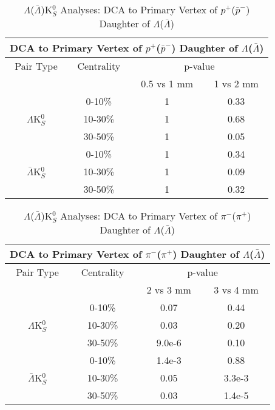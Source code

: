 \documentclass[../AnalysisNoteJBuxton.tex]{subfiles}
\begin{document}
\begin{table}
 \centering
 \begin{tabular}{|c|c|c|c|}
 \multicolumn{4}{c}{DCA to Primary Vertex of $p^{+}$($\bar{p}^{-}$) Daughter of $\Lambda$($\bar{\Lambda}$)} \\
  \hline
  Pair Type & Centrality & \multicolumn{2}{c|}{p-value} \\
  \cline{3-4}
   & & 0.5 vs 1 mm & 1 vs 2 mm \\
  \hline
   & 0-10\% & 1 & 0.33 \\
  $\Lambda$K$^{0}_{S}$ 
   & 10-30\% & 1 & 0.68 \\
   & 30-50\% & 1 & 0.05 \\
  \hline
   & 0-10\% & 1 & 0.34 \\
  $\bar{\Lambda}$K$^{0}_{S}$ 
   & 10-30\% & 1 & 0.09 \\
   & 30-50\% & 1 & 0.32 \\
  \hline
 \end{tabular}
 \caption{$\Lambda$($\bar{\Lambda}$)K$^{0}_{S}$ Analyses: DCA to Primary Vertex of $p^{+}$($\bar{p}^{-}$) Daughter of $\Lambda$($\bar{\Lambda}$)}
 \label{tab:DcaToPrimVertexProtonDaughtOfLamLamK0}
\end{table}

\begin{table}
 \centering
 \begin{tabular}{|c|c|c|c|}
 \multicolumn{4}{c}{DCA to Primary Vertex of $\pi^{-}$($\pi^{+}$) Daughter of $\Lambda$($\bar{\Lambda}$)} \\
  \hline
  Pair Type & Centrality & \multicolumn{2}{c|}{p-value} \\
  \cline{3-4}
   & & 2 vs 3 mm & 3 vs 4 mm \\
  \hline
   & 0-10\% & 0.07 & 0.44 \\
  $\Lambda$K$^{0}_{S}$ 
   & 10-30\% & 0.03 & 0.20 \\
   & 30-50\% & 9.0e-6 & 0.10 \\
  \hline
   & 0-10\% & 1.4e-3 & 0.88 \\
  $\bar{\Lambda}$K$^{0}_{S}$ 
   & 10-30\% & 0.05 & 3.3e-3 \\
   & 30-50\% & 0.03 & 1.4e-5 \\
  \hline
 \end{tabular}
 \caption{$\Lambda$($\bar{\Lambda}$)K$^{0}_{S}$ Analyses: DCA to Primary Vertex of $\pi^{-}$($\pi^{+}$) Daughter of $\Lambda$($\bar{\Lambda}$)}
 \label{tab:DcaToPrimVertexPionDaughtOfLamLamK0}
\end{table}
\end{document}
